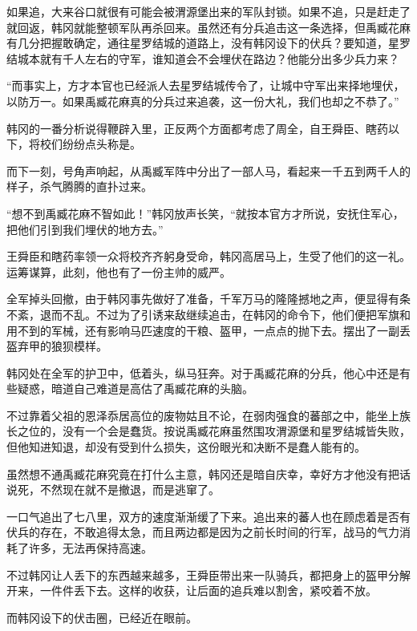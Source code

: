 如果追，大来谷口就很有可能会被渭源堡出来的军队封锁。如果不追，只是赶走了就回返，韩冈就能整顿军队再杀回来。虽然还有分兵追击这一条选择，但禹臧花麻有几分把握敢确定，通往星罗结城的道路上，没有韩冈设下的伏兵？要知道，星罗结城本就有千人左右的守军，谁知道会不会埋伏在路边？他能分出多少兵力来？

“而事实上，方才本官也已经派人去星罗结城传令了，让城中守军出来择地埋伏，以防万一。如果禹臧花麻真的分兵过来追袭，这一份大礼，我们也却之不恭了。”

韩冈的一番分析说得鞭辟入里，正反两个方面都考虑了周全，自王舜臣、瞎药以下，将校们纷纷点头称是。

而下一刻，号角声响起，从禹臧军阵中分出了一部人马，看起来一千五到两千人的样子，杀气腾腾的直扑过来。

“想不到禹臧花麻不智如此！”韩冈放声长笑，“就按本官方才所说，安抚住军心，把他们引到我们埋伏的地方去。”

王舜臣和瞎药率领一众将校齐齐躬身受命，韩冈高居马上，生受了他们的这一礼。运筹谋算，此刻，他也有了一份主帅的威严。

全军掉头回撤，由于韩冈事先做好了准备，千军万马的隆隆撼地之声，便显得有条不紊，退而不乱。不过为了引诱来敌继续追击，在韩冈的命令下，他们便把军旗和用不到的军械，还有影响马匹速度的干粮、盔甲，一点点的抛下去。摆出了一副丢盔弃甲的狼狈模样。

韩冈处在全军的护卫中，低着头，纵马狂奔。对于禹臧花麻的分兵，他心中还是有些疑惑，暗道自己难道是高估了禹臧花麻的头脑。

不过靠着父祖的恩泽忝居高位的废物姑且不论，在弱肉强食的蕃部之中，能坐上族长之位的，没有一个会是蠢货。按说禹臧花麻虽然围攻渭源堡和星罗结城皆失败，但他知进知退，却没有受到什么损失，这份眼光和决断不是蠢人能有的。

虽然想不通禹臧花麻究竟在打什么主意，韩冈还是暗自庆幸，幸好方才他没有把话说死，不然现在就不是撤退，而是逃窜了。

一口气追出了七八里，双方的速度渐渐缓了下来。追出来的蕃人也在顾虑着是否有伏兵的存在，不敢追得太急，而且两边都是因为之前长时间的行军，战马的气力消耗了许多，无法再保持高速。

不过韩冈让人丢下的东西越来越多，王舜臣带出来一队骑兵，都把身上的盔甲分解开来，一件件丢下去。这样的收获，让后面的追兵难以割舍，紧咬着不放。

而韩冈设下的伏击圈，已经近在眼前。

